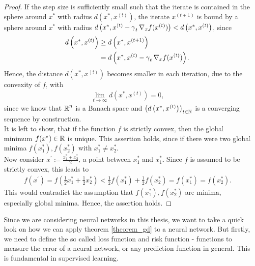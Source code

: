 \begin{proof}
If the step size is sufficiently small such that the iterate is contained in the sphere around $x^{\ast}$ with radius $d\left(x^{\ast}, x^{(t)}\right)$,
the iterate $x^{(t+1)}$ is bound by a sphere around $x^{\ast}$ with radius $d\left(x^{\ast}, x^{(t)} - \operatorname{\gamma}_t \nabla_x f(x^{(t)})\right) < d\left(x^{\ast}, x^{(t)}\right)$, since
\begin{align*}
d\left(x^{\ast}, x^{(t)}\right) &\geq d\left(x^{\ast}, x^{(t+1)}\right)\\
&= d\left(x^{\ast}, x^{(t)} - \operatorname{\gamma}_t \nabla_x f(x^{(t)})\right).
\end{align*}
Hence, the distance $d(x^{\ast}, x^{(t)})$ becomes smaller in each iteration, due to the convexity of $f$, with
\begin{align*}
\lim_{t\to\infty} d\left(x^{\ast}, x^{(t)}\right) = 0,
\end{align*}
since we know that $\operatorname{\mathbb{R}}^n$ is a Banach space and $\left(d\left(x^{\ast}, x^{(t)}\right)\right)_{t\in\operatorname{\mathbb{N}}}$ is a converging sequence by construction.\\
It is left to show, that if the function $f$ is strictly convex, then the global minimum $f(x^{\ast})\in\operatorname{\mathbb{R}}$ is unique. This assertion holds, since if there were two global minima $f\left(x_1^{\ast}\right), f\left(x_2^{\ast}\right)$ with $x_1^{\ast} \neq x_2^{\ast}$.\\
Now consider $x^{\prime} \coloneqq \frac{x_1^{\ast} + x_2^{\ast}}{2}$, a point between $x_1^{\ast}$ and $x_1^{\ast}$. Since $f$ is assumed to be strictly convex, this leads to
\begin{align*}
f\left(x^{\prime} \right) = f\left(\frac{1}{2}x_1^{\ast} + \frac{1}{2} x_2^{\ast}\right) < \frac{1}{2} f\left(x_1^{\ast} \right) + \frac{1}{2} f\left(x_2^{\ast}\right) = f\left(x_1^{\ast}\right) = f\left(x_2^{\ast}\right).
\end{align*}
This would contradict the assumption that $f\left(x_1^{\ast}\right), f\left(x_2^{\ast}\right)$ are minima, especially global minima. Hence, the assertion holds.
\end{proof}


Since we are considering neural networks in this thesis, we want to take a quick look on how we can apply theorem \ref{theorem_gd} to a neural network. But firstly, we need to define the so called loss function and risk function - functions to measure the error of a neural network, or any prediction function in general. This is fundamental in supervised learning.


